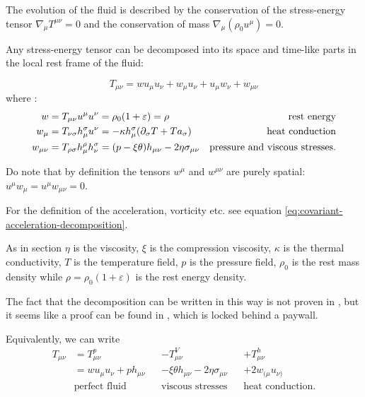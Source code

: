 \documentclass[main.tex]{subfiles}
\begin{document}
The evolution of the fluid is described by the conservation of the stress-energy tensor \(\nabla_\mu T ^{\mu \nu} =0\) and the conservation of mass \(\nabla_\mu (\rho_0 u^\mu) =0\).

Any stress-energy tensor can be decomposed into its space and time-like parts in the local rest frame of the fluid:

\begin{equation} \label{eq:stress-energy-tensor-decomposition}
    T_{\mu \nu} = w u_\mu u_\nu + w_\mu u_\nu + u_\mu w_\nu + w _{\mu \nu}
\end{equation}
where \cite[eqs. 8.2, 8.3, 8.5]{Taub:1948}:
\begin{subequations} \label{eq:components-stress-energy-tensor}
\begin{align}
  w &=  T _{\mu \nu} u^\mu u^\nu = \rho_0 (1 + \varepsilon) = \rho & \text{rest energy} \\
  w_\mu &= T _{\nu \sigma} h^\sigma _\mu u^\nu  = -\kappa h_\mu ^\sigma  \qty(\partial_\sigma T + T a_\sigma) & \text{heat conduction} \\
  w_{\mu \nu} &= T_{\rho \sigma} h^\rho _\mu h^\sigma_\nu = \qty(p - \xi \theta) h_{\mu \nu} - 2 \eta \sigma_{\mu \nu}  & \text{pressure and viscous stresses.}
\end{align}
\end{subequations}

Do note that by definition the tensors \(w^\mu\) and \(w^{\mu\nu}\) are purely spatial: \(u^\mu w_\mu = u^\mu w_{\mu \nu} = 0\).

For the definition of the acceleration, vorticity etc. see equation \eqref{eq:covariant-acceleration-decomposition}.

As in section  \(\eta\) is the viscosity, \(\xi\) is the compression viscosity,  \(\kappa\) is the thermal conductivity, \(T\) is the temperature field, \(p\) is the pressure field, \(\rho_0\) is the rest mass density while \(\rho = \rho_0 (1 + \varepsilon)\) is the rest energy density.

\begin{greenbox}
    The fact that the decomposition can be written in this way is not proven in \cite[]{Taub:1978}, but it seems like a proof can be found in \cite[]{Eckart:1940}, which is locked behind a paywall.
\end{greenbox}

Equivalently, we can write
\begin{subequations} \label{eq:stress-energy-tensor-decomposition-2}
\begin{align}
  T_{\mu\nu} &= T_{\mu\nu}^p && - T_{\mu\nu}^V &&+ T_{\mu\nu}^h  \\
  &= w u_\mu u_\nu + p h_{\mu\nu} &&-\xi \theta h_{\mu\nu} - 2 \eta \sigma_{\mu\nu} &&+2w_{(\mu} u_{\nu)}  \\
  &\text{perfect fluid} && \text{viscous stresses} && \text{heat conduction.} \nonumber
\end{align}
\end{subequations}
\end{document}
